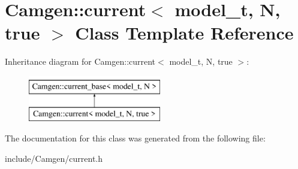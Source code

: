 \hypertarget{a00110}{\section{Camgen\-:\-:current$<$ model\-\_\-t, N, true $>$ Class Template Reference}
\label{a00110}
}
Inheritance diagram for Camgen\-:\-:current$<$ model\-\_\-t, N, true $>$\-:\begin{figure}[H]
\begin{center}
\leavevmode
\includegraphics[height=2.000000cm]{a00110}
\end{center}
\end{figure}


The documentation for this class was generated from the following file\-:\begin{DoxyCompactItemize}
\item 
include/\-Camgen/current.\-h\end{DoxyCompactItemize}
